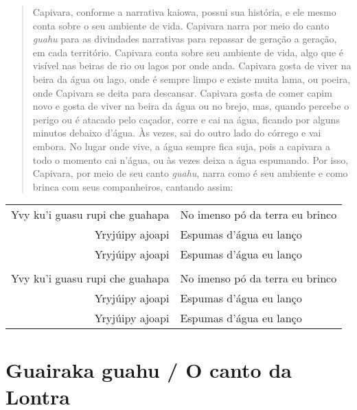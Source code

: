 \begin{itemize}
\begin{quote}
Capivara, conforme a narrativa kaiowa, possui sua história, e ele mesmo
conta sobre o seu ambiente de vida. Capivara narra por meio do canto
\emph{guahu} para as divindades narrativas para repassar de geração a
geração, em cada território. Capivara conta sobre seu ambiente de vida,
algo que é visível nas beiras de rio ou lagos por onde anda. Capivara
gosta de viver na beira da água ou lago, onde é sempre limpo e existe
muita lama, ou poeira, onde Capivara se deita para descansar. Capivara
gosta de comer capim novo e gosta de viver na beira da água ou no brejo,
mas, quando percebe o perigo ou é atacado pelo caçador, corre e cai na
água, ficando por alguns minutos debaixo d'água. Às vezes, sai do outro
lado do córrego e vai embora. No lugar onde vive, a água sempre fica
suja, pois a capivara a todo o momento cai n'água, ou às vezes deixa a
água espumando. Por isso, Capivara, por meio de seu canto \emph{guahu},
narra como é seu ambiente e como brinca com seus companheiros, cantando
assim:
\end{quote}

\begin{table}[]
\begin{tabular}{rl}
Yvy ku'i guasu rupi che guahapa          & No imenso pó da terra eu brinco           \\
Yryjúipy ajoapi          & Espumas d'água eu lanço           \\
Yryjúipy ajoapi  		& Espumas d'água eu lanço \\
                  &                     \\
Yvy ku'i guasu rupi che guahapa          & No imenso pó da terra eu brinco           \\
Yryjúipy ajoapi          & Espumas d'água eu lanço           \\
Yryjúipy ajoapi  		& Espumas d'água eu lanço \\
\end{tabular}
\end{table}

\chapter{Guairaka guahu / O canto da Lontra}


\end{itemize}
